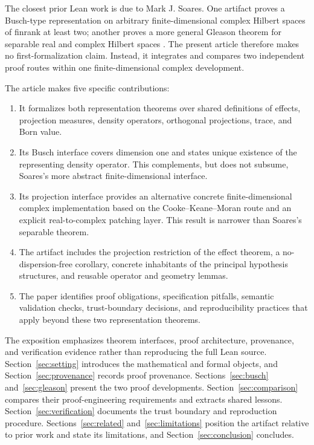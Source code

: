 \documentclass[pdflatex,sn-mathphys-num]{sn-jnl}
\theoremstyle{thmstyleone}
\theoremstyle{thmstylethree}
\begin{document}
The closest prior Lean work is due to Mark J. Soares. One artifact proves a Busch-type representation on arbitrary finite-dimensional complex Hilbert spaces of finrank at least two; another proves a more general Gleason theorem for separable real and complex Hilbert spaces \cite{soaresbusch2026,soaresgleason2026}. The present article therefore makes no first-formalization claim. Instead, it integrates and compares two independent proof routes within one finite-dimensional complex development.

The article makes five specific contributions:

\begin{enumerate}
\def\labelenumi{\arabic{enumi}.}
\item
  It formalizes both representation theorems over shared definitions of effects, projection measures, density operators, orthogonal projections, trace, and Born value.
\item
  Its Busch interface covers dimension one and states unique existence of the representing density operator. This complements, but does not subsume, Soares's more abstract finite-dimensional interface.
\item
  Its projection interface provides an alternative concrete finite-dimensional complex implementation based on the Cooke--Keane--Moran route and an explicit real-to-complex patching layer. This result is narrower than Soares's separable theorem.
\item
  The artifact includes the projection restriction of the effect theorem, a no-dispersion-free corollary, concrete inhabitants of the principal hypothesis structures, and reusable operator and geometry lemmas.
\item
  The paper identifies proof obligations, specification pitfalls, semantic validation checks, trust-boundary decisions, and reproducibility practices that apply beyond these two representation theorems.
\end{enumerate}

The exposition emphasizes theorem interfaces, proof architecture, provenance, and verification evidence rather than reproducing the full Lean source. Section~\ref{sec:setting} introduces the mathematical and formal objects, and Section~\ref{sec:provenance} records proof provenance. Sections~\ref{sec:busch} and~\ref{sec:gleason} present the two proof developments. Section~\ref{sec:comparison} compares their proof-engineering requirements and extracts shared lessons. Section~\ref{sec:verification} documents the trust boundary and reproduction procedure. Sections~\ref{sec:related} and~\ref{sec:limitations} position the artifact relative to prior work and state its limitations, and Section~\ref{sec:conclusion} concludes.
\end{document}
